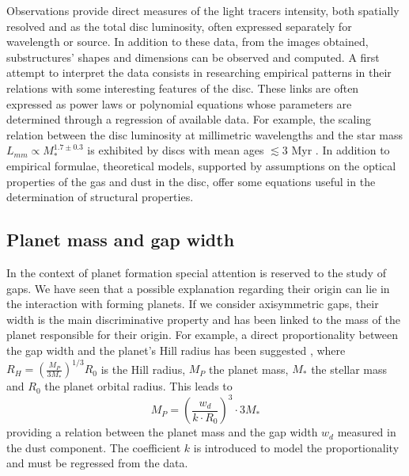 \documentclass[a4paper,10pt]{report}
\begin{document}
Observations provide direct measures of the light tracers intensity, both spatially resolved and as
the total disc luminosity, often expressed separately for wavelength or source.
In addition to these data, from the images obtained, substructures' shapes and
dimensions can be observed and computed.
A first attempt to interpret the data consists in researching empirical patterns in their relations with some
interesting features of the disc. These links are often expressed as power laws or polynomial equations whose parameters are
determined through a regression of available data.
For example, the scaling relation between the disc luminosity at millimetric wavelengths and the star mass $L_{mm} \propto M_*^{1.7\pm0.3}$
is exhibited by discs with mean ages $\lesssim 3$ Myr \cite[p. 13]{disc_rev}.
In addition to empirical formulae, theoretical models, supported by assumptions on
the optical properties of the gas and dust in the disc, offer some equations useful
in the determination of structural properties.

\subsection{Planet mass and gap width}

In the context of planet formation special attention is reserved to the study of gaps. 
We have seen that a possible explanation regarding their origin can lie in the interaction with
forming planets. If we consider axisymmetric gaps, their width is the main discriminative property and
has been linked to the mass of the planet responsible for their origin.
For example, a direct proportionality between the gap width and the planet's Hill radius has been suggested \cite{Lodato_2019}, where
$
    R_H = (\frac{M_P}{3M_*})^{1/3}R_0
$
is the Hill radius, $M_P$ the planet mass, $M_*$ the stellar mass and $R_0$ the planet orbital radius.
This leads to 
\begin{equation}
    M_P = (\frac{w_d}{k\cdot R_0})^3\cdot 3M_*
\end{equation}
providing a relation between the planet mass and the gap width $w_d$ measured in the dust component.
The coefficient $k$ is introduced to model the proportionality and must be regressed from the data.
\end{document}
